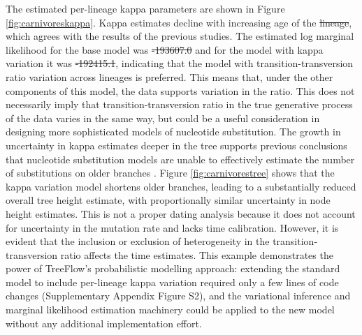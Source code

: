 \documentclass[oupdraft]{sysbio_sse}
\let\cite\citep
\providecommand{\DIFadd}[1]{{\protect\color{blue}\uwave{#1}}} %
\providecommand{\DIFdel}[1]{{\protect\color{red}\sout{#1}}} %
\providecommand{\DIFaddbegin}{} %
\providecommand{\DIFaddend}{} %
\providecommand{\DIFdelbegin}{} %
\providecommand{\DIFdelend}{} %
\begin{document}
The estimated per-lineage kappa parameters are shown in Figure \ref{fig:carnivoreskappa}. Kappa estimates decline with increasing age of the \DIFdelbegin \DIFdel{lineage}\DIFdelend \DIFaddbegin \DIFadd{branch}\DIFaddend , which agrees with the results of the previous studies. The estimated log marginal likelihood for the base model was \DIFdelbegin \DIFdel{-193607.0 }\DIFdelend \DIFaddbegin \DIFadd{-193606.6 }\DIFaddend and for the model with kappa variation it was \DIFdelbegin \DIFdel{-192415.1}\DIFdelend \DIFaddbegin \DIFadd{-192414.7}\DIFaddend , indicating that the model with transition-transversion ratio variation across lineages is preferred. This means that, under the other components of this model, the data supports variation in the ratio. This does not necessarily imply that transition-transversion ratio in the true generative process of the data varies in the same way, but could be a useful consideration in designing more sophisticated models of nucleotide substitution. The growth in uncertainty in kappa estimates deeper in the tree supports previous conclusions that nucleotide substitution models are unable to effectively estimate the number of substitutions on older branches \cite{duchene2015declining}. Figure \ref{fig:carnivorestree} shows that the kappa variation model shortens older branches, leading to a substantially reduced overall tree height estimate, with proportionally similar uncertainty in node height estimates. This is not a proper dating analysis because it does not account for uncertainty in the mutation rate and lacks time calibration. However, it is evident that the inclusion or exclusion of heterogeneity in the transition-transversion ratio affects the time estimates. This example demonstrates the power of TreeFlow's probabilistic modelling approach: extending the standard model to include per-lineage kappa variation required only a few lines of code changes (Supplementary Appendix Figure S2), and the variational inference and marginal likelihood estimation machinery could be applied to the new model without any additional implementation effort.
\end{document}
